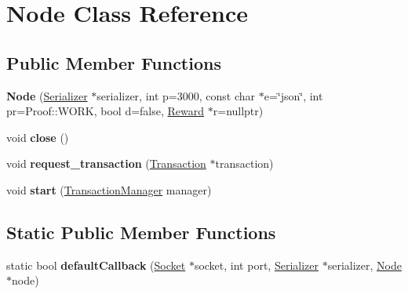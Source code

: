 \hypertarget{classNode}{}\section{Node Class Reference}
\label{classNode}
\subsection*{Public Member Functions}
\begin{DoxyCompactItemize}
\item 
\mbox{\label{classNode_a8c394f4b90a63f702722b859654f1364}} 
{\bfseries Node} (\mbox{\hyperlink{classSerializer}{Serializer}} $\ast$serializer, int p=3000, const char $\ast$e=\char`\"{}json\char`\"{}, int pr=Proof\+::\+W\+O\+RK, bool d=false, \mbox{\hyperlink{classReward}{Reward}} $\ast$r=nullptr)
\item 
\mbox{\label{classNode_af8cfc7b3fb2f102914daa5fc3b9c52f6}} 
void {\bfseries close} ()
\item 
\mbox{\label{classNode_a3a3c8197be701cb23a3c9b2a2c981e94}} 
void {\bfseries request\+\_\+transaction} (\mbox{\hyperlink{classTransaction}{Transaction}} $\ast$transaction)
\item 
\mbox{\label{classNode_ade99d966ef536d445f562fa5023ef7f5}} 
void {\bfseries start} (\mbox{\hyperlink{classTransactionManager}{Transaction\+Manager}} manager)
\end{DoxyCompactItemize}
\subsection*{Static Public Member Functions}
\begin{DoxyCompactItemize}
\item 
\mbox{\label{classNode_a4155ec665aedf613ffed880045d73693}} 
static bool {\bfseries default\+Callback} (\mbox{\hyperlink{classSocket}{Socket}} $\ast$socket, int port, \mbox{\hyperlink{classSerializer}{Serializer}} $\ast$serializer, \mbox{\hyperlink{classNode}{Node}} $\ast$node)
\end{DoxyCompactItemize}
